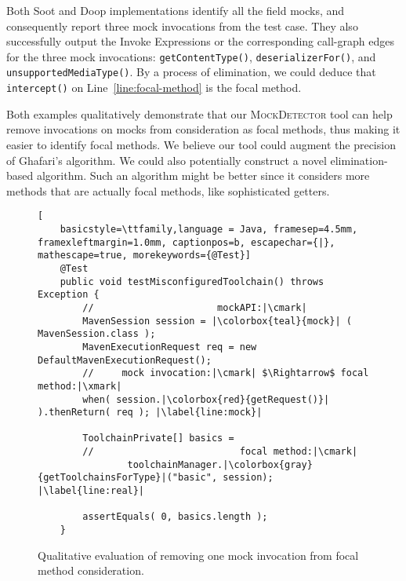 Both Soot and Doop implementations identify all the field mocks, and consequently report three mock invocations from the test case. They also successfully output the Invoke Expressions or the corresponding call-graph edges for the three mock invocations: \texttt{getContentType()}, \texttt{deserializerFor()}, and \texttt{unsupportedMediaType()}. By a process of elimination, we could deduce that \texttt{intercept()} on Line~\ref{line:focal-method} is the focal method. 

Both examples qualitatively demonstrate that our \textsc{MockDetector} tool can help remove invocations on mocks from consideration as focal methods, thus making it easier to identify focal methods. We believe our tool could augment the precision of Ghafari's algorithm. We could also potentially construct a novel elimination-based algorithm. Such an algorithm might be better since it considers more methods that are actually focal methods, like sophisticated getters.

\begin{figure}[h]
	\begin{lstlisting}[
	basicstyle=\ttfamily,language = Java, framesep=4.5mm, framexleftmargin=1.0mm, captionpos=b, escapechar={|}, mathescape=true, morekeywords={@Test}]
	@Test
	public void testMisconfiguredToolchain() throws Exception {
		//        			   	mockAPI:|\cmark|
		MavenSession session = |\colorbox{teal}{mock}| ( MavenSession.class );
		MavenExecutionRequest req = new DefaultMavenExecutionRequest();
		//     mock invocation:|\cmark| $\Rightarrow$ focal method:|\xmark|
		when( session.|\colorbox{red}{getRequest()}| ).thenReturn( req ); |\label{line:mock}|
		
		ToolchainPrivate[] basics =
		//     					 	focal method:|\cmark|
				toolchainManager.|\colorbox{gray}{getToolchainsForType}|("basic", session); |\label{line:real}|
		
		assertEquals( 0, basics.length );
	}
	\end{lstlisting}
	
	\caption{Qualitative evaluation of removing one mock invocation from focal method consideration.}
	\label{fig:mockExampleEvaluation}
\end{figure}


